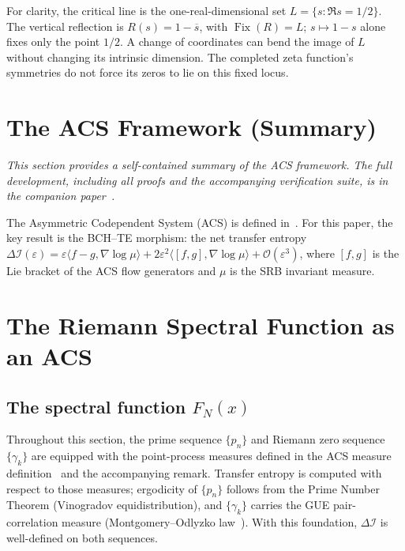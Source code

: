 \documentclass[11pt,a4paper]{article}
\theoremstyle{plain}
\theoremstyle{definition}
\theoremstyle{remark}
\newcommand{\DI}{\Delta\mathcal{I}}
\newcommand{\Order}[1]{\mathcal{O}(#1)}
\newcommand{\eps}{\varepsilon}
\begin{document}
For clarity, the critical line is the one-real-dimensional set
$L=\{s:\Re s=1/2\}$. The vertical reflection is
$R(s)=1-\overline{s}$, with $\operatorname{Fix}(R)=L$;
$s\mapsto1-s$ alone fixes only the point $1/2$. A change of coordinates can
bend the image of $L$ without changing its intrinsic dimension. The completed
zeta function's symmetries do not force its zeros to lie on this fixed locus.

\section{The ACS Framework (Summary)}
\label{sec:acs}

\noindent\textit{This section provides a self-contained summary of the ACS
framework.  The full development, including all proofs and the accompanying
verification suite, is in the companion paper~\cite{Wallace2026a}.}

\medskip\noindent
The Asymmetric Codependent System (ACS) is defined in~\cite{Wallace2026a}.
For this paper, the key result is the BCH--TE morphism: the net transfer
entropy $\DI(\eps) = \eps\langle f{-}g, \nabla\log\mu\rangle + 2\eps^2\langle[f,g],\nabla\log\mu\rangle + \Order{\eps^3}$, where $[f,g]$ is the Lie bracket of the ACS flow generators and $\mu$ is the SRB invariant measure.
\section{The Riemann Spectral Function as an ACS}
\label{sec:riemann}

\subsection{The spectral function \texorpdfstring{$F_N(x)$}{F\_N(x)}}

Throughout this section, the prime sequence $\{p_n\}$ and Riemann zero sequence $\{\gamma_k\}$ are equipped with the point-process measures defined in the ACS measure definition~\cite{Wallace2026a} and the accompanying remark.  Transfer entropy is computed with respect to those measures; ergodicity of $\{p_n\}$ follows from the Prime Number Theorem (Vinogradov equidistribution), and $\{\gamma_k\}$ carries the GUE pair-correlation measure (Montgomery--Odlyzko law~\cite{Montgomery1973,Odlyzko1987}).  With this foundation, $\DI$ is well-defined on both sequences.
\end{document}
